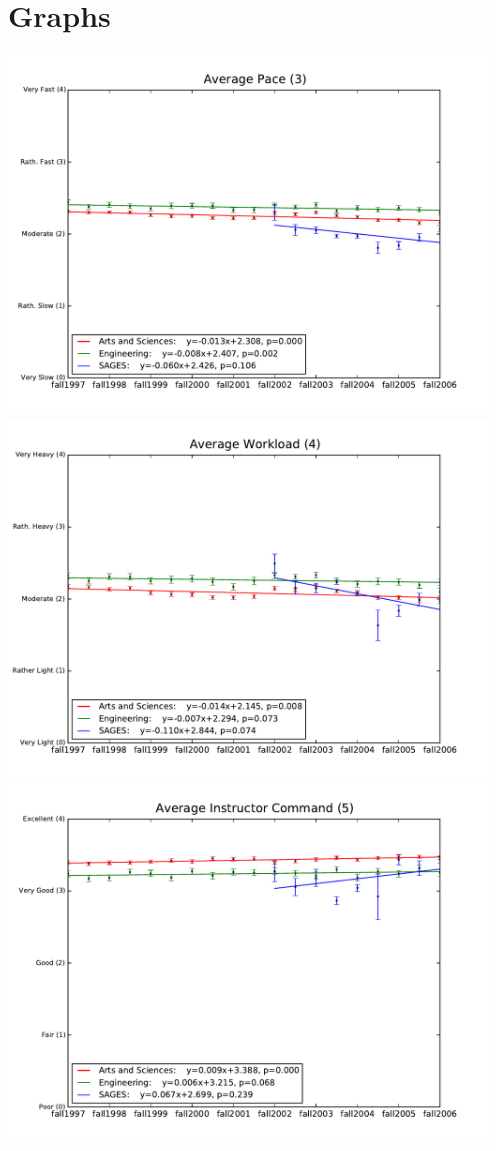 \documentclass[12pt]{article}
\begin{document}
\section{Graphs}
\begin{center}
    \includegraphics[width=5in]{figures/3_pace_over_time.pdf} \\
    \includegraphics[width=5in]{figures/4_workload_over_time.pdf} \\
    \includegraphics[width=5in]{figures/5_command_over_time.pdf} \\

\end{center}
\end{document}

